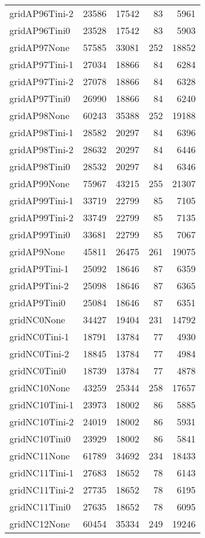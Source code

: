 \begin{longtable}{lrrrr}
gridAP96Tini-2 & 23586 & 17542 & 83 & 5961 \\
gridAP96Tini0 & 23528 & 17542 & 83 & 5903 \\
gridAP97None & 57585 & 33081 & 252 & 18852 \\
gridAP97Tini-1 & 27034 & 18866 & 84 & 6284 \\
gridAP97Tini-2 & 27078 & 18866 & 84 & 6328 \\
gridAP97Tini0 & 26990 & 18866 & 84 & 6240 \\
gridAP98None & 60243 & 35388 & 252 & 19188 \\
gridAP98Tini-1 & 28582 & 20297 & 84 & 6396 \\
gridAP98Tini-2 & 28632 & 20297 & 84 & 6446 \\
gridAP98Tini0 & 28532 & 20297 & 84 & 6346 \\
gridAP99None & 75967 & 43215 & 255 & 21307 \\
gridAP99Tini-1 & 33719 & 22799 & 85 & 7105 \\
gridAP99Tini-2 & 33749 & 22799 & 85 & 7135 \\
gridAP99Tini0 & 33681 & 22799 & 85 & 7067 \\
gridAP9None & 45811 & 26475 & 261 & 19075 \\
gridAP9Tini-1 & 25092 & 18646 & 87 & 6359 \\
gridAP9Tini-2 & 25098 & 18646 & 87 & 6365 \\
gridAP9Tini0 & 25084 & 18646 & 87 & 6351 \\
gridNC0None & 34427 & 19404 & 231 & 14792 \\
gridNC0Tini-1 & 18791 & 13784 & 77 & 4930 \\
gridNC0Tini-2 & 18845 & 13784 & 77 & 4984 \\
gridNC0Tini0 & 18739 & 13784 & 77 & 4878 \\
gridNC10None & 43259 & 25344 & 258 & 17657 \\
gridNC10Tini-1 & 23973 & 18002 & 86 & 5885 \\
gridNC10Tini-2 & 24019 & 18002 & 86 & 5931 \\
gridNC10Tini0 & 23929 & 18002 & 86 & 5841 \\
gridNC11None & 61789 & 34692 & 234 & 18433 \\
gridNC11Tini-1 & 27683 & 18652 & 78 & 6143 \\
gridNC11Tini-2 & 27735 & 18652 & 78 & 6195 \\
gridNC11Tini0 & 27635 & 18652 & 78 & 6095 \\
gridNC12None & 60454 & 35334 & 249 & 19246 \\

\end{longtable}
